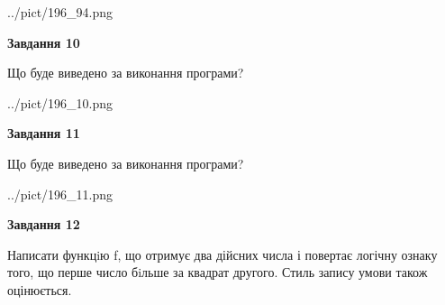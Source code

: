 \documentclass[12pt, ukrainian]{article}
\begin{document}
{\begin {large}
\begin{center}
	{../pict/196_94.png}
\end{center}
\newpage

{\begin {center}\textbf{Завдання 10}\end {center}}

Що буде виведено за виконання програми?\par
\begin{center}
	{../pict/196_10.png}
\end{center}
\newpage

{\begin {center}\textbf{Завдання 11}\end {center}}

Що буде виведено за виконання програми?\par
\begin{center}
	{../pict/196_11.png}
\end{center}
\newpage

{\begin {center}\textbf{Завдання 12}\end {center}}


Написати функцiю f, що отримує два дійсних числа і повертає логічну ознаку того, що перше число бiльше за квадрат другого. Стиль запису умови також оцінюється.\par
\newpage

\end {large}}
\end{document}
